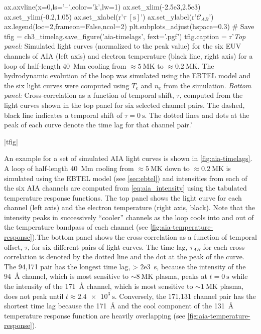 \begin{pycode}
ax.axvline(x=0,ls='--',color='k',lw=1)
ax.set_xlim(-2.5e3,2.5e3)
ax.set_ylim(-0.2,1.05)
ax.set_xlabel(r'$\tau$ $[\si{\second}]$')
ax.set_ylabel(r'$\mathcal{C}_{AB}$')
ax.legend(loc=2,frameon=False,ncol=2)
plt.subplots_adjust(hspace=0.3)
# Save
tfig = ch3_timelag.save_figure('aia-timelags', fext='.pgf')
tfig.caption = r'\textit{Top panel:} Simulated light curves (normalized to the peak value) for the six EUV channels of AIA (left axis) and electron temperature (black line, right axis) for a loop of half-length \SI{40}{\mega\m} cooling from $\approx\SI{5}{\mega\kelvin}$ to $\approx\SI{0.2}{\mega\kelvin}$. The hydrodynamic evolution of the loop was simulated using the EBTEL model and the six light curves were computed using $T_e$ and $n_e$ from the simulation. \textit{Bottom panel:} Cross-correlation as a function of temporal shift, $\tau$, computed from the light curves shown in the top panel for six selected channel pairs. The dashed, black line indicates a temporal shift of $\tau=\SI{0}{\second}$. The dotted lines and dots at the peak of each curve denote the time lag for that channel pair.'
\end{pycode}
|tfig|

An example for a set of simulated AIA light curves is shown in \autoref{fig:aia-timelags}. A loop of half-length \SI{40}{\mega\m} cooling from $\approx\SI{5}{\mega\kelvin}$ down to $\approx\SI{0.2}{\mega\kelvin}$ is simulated using the EBTEL model (see \autoref{sec:ebtel}) and intensities from each of the six AIA channels are computed from \autoref{eq:aia_intensity} using the tabulated temperature response functions. The top panel shows the light curve for each channel (left axis) and the electron temperature (right axis, black). Note that the intensity peaks in successively ``cooler'' channels as the loop cools into and out of the temperature bandpass of each channel (see \autoref{fig:aia-temperature-response}).The bottom panel shows the cross-correlation as a function of temporal offset, $\tau$, for six different pairs of light curves. The time lag, $\tau_{AB}$ for each cross-correlation is denoted by the dotted line and the dot at the peak of the curve. The 94,171 pair has the longest time lag, \SI{> 2e3}{\second}, because the intensity of the \SI{94}{\angstrom} channel, which is most sensitive to $\sim\SI{8}{\mega\kelvin}$ plasma, peaks at $t=\SI{0}{\second}$ while the intensity of the \SI{171}{\angstrom} channel, which is most sensitive to $\sim\SI{1}{\mega\kelvin}$ plasma, does not peak until $t\approx\SI{2.4e3}{\second}$. Conversely, the 171,131 channel pair has the shortest time lag because the \SI{171}{\angstrom} and the cool component of the \SI{131}{\angstrom} temperature response function are heavily overlapping (see \autoref{fig:aia-temperature-response}). 

